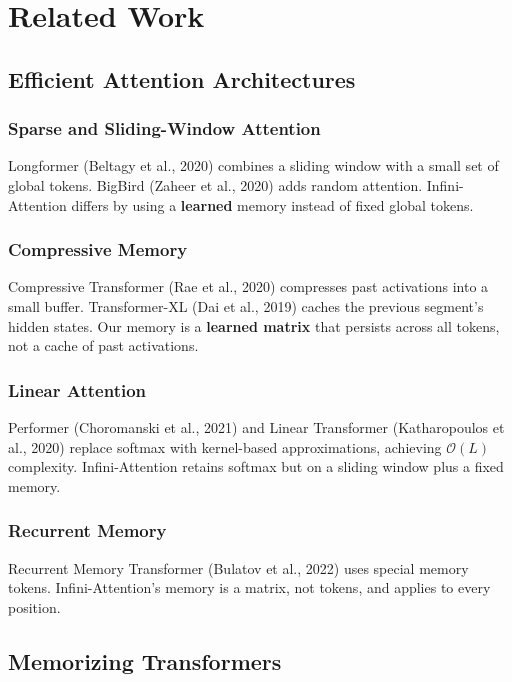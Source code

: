 
\section{Related Work}

\subsection{Efficient Attention Architectures}

\subsubsection{Sparse and Sliding-Window Attention}

Longformer (Beltagy et al., 2020) combines a sliding window with a small 
set of global tokens. BigBird (Zaheer et al., 2020) adds random attention. 
Infini-Attention differs by using a \textbf{learned} memory instead of fixed 
global tokens.

\subsubsection{Compressive Memory}

Compressive Transformer (Rae et al., 2020) compresses past activations into 
a small buffer. Transformer-XL (Dai et al., 2019) caches the previous 
segment's hidden states. Our memory is a \textbf{learned matrix} that persists 
across all tokens, not a cache of past activations.

\subsubsection{Linear Attention}

Performer (Choromanski et al., 2021) and Linear Transformer (Katharopoulos 
et al., 2020) replace softmax with kernel-based approximations, achieving 
$\mathcal{O}(L)$ complexity. Infini-Attention retains softmax but on a 
sliding window plus a fixed memory.

\subsubsection{Recurrent Memory}

Recurrent Memory Transformer (Bulatov et al., 2022) uses special memory 
tokens. Infini-Attention's memory is a matrix, not tokens, and applies to 
every position.

\subsection{Memorizing Transformers}

